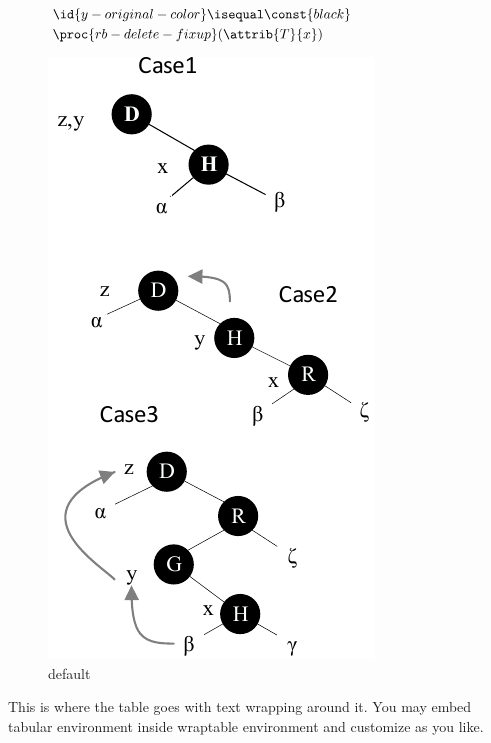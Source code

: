 \documentclass[a4paper,12pt]{article}
\begin{document}
\begin{figure}[ht]
\begin{minipage}[b]{0.45\linewidth}
\begin{codebox}
    \li    \If $ \id{y-original-color} \isequal \const{black} $
    \li       \Then $\proc{rb-delete-fixup}(\attrib{T}{x})$
    \End
\end{codebox}
  \label{fig:figure1}
  \end{minipage}
  \hspace{2cm}
  \begin{minipage}[b]{0.45\linewidth}
  \centering
  \includegraphics[width=\textwidth]{vector/red-black-tree/delete/rb_delete_cases_single.pdf}
  \caption{default}
  \label{fig:figure2}
  \end{minipage}
  \end{figure}
  This is where the table goes with text wrapping around it. You may 
embed tabular environment inside wraptable environment and customize as you like.
\end{document}
